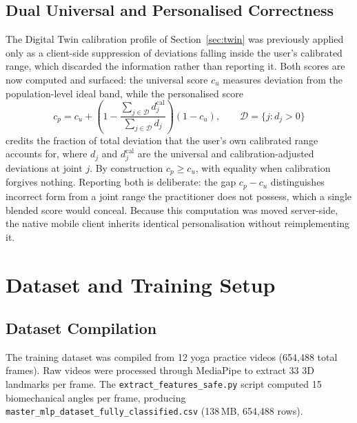 \documentclass[conference]{IEEEtran}
\begin{document}
\subsection{Dual Universal and Personalised Correctness}
\label{sec:dualscore}

The Digital Twin calibration profile of Section~\ref{sec:twin} was previously
applied only as a client-side suppression of deviations falling inside the
user's calibrated range, which discarded the information rather than
reporting it. Both scores are now computed and surfaced: the universal score
$c_u$ measures deviation from the population-level ideal band, while the
personalised score
\begin{equation}
c_p = c_u + \left(1 - \frac{\sum_{j \in \mathcal{D}} d_j^{\mathrm{cal}}}
{\sum_{j \in \mathcal{D}} d_j}\right)\left(1 - c_u\right),
\qquad
\mathcal{D} = \{j : d_j > 0\}
\label{eq:personal}
\end{equation}
credits the fraction of total deviation that the user's own calibrated range
accounts for, where $d_j$ and $d_j^{\mathrm{cal}}$ are the universal and
calibration-adjusted deviations at joint $j$. By construction $c_p \ge c_u$,
with equality when calibration forgives nothing. Reporting both is
deliberate: the gap $c_p - c_u$ distinguishes incorrect form from a joint
range the practitioner does not possess, which a single blended score would
conceal. Because this computation was moved server-side, the native mobile
client inherits identical personalisation without reimplementing it.

\section{Dataset and Training Setup}
\label{sec:data}

\subsection{Dataset Compilation}

The training dataset was compiled from 12 yoga practice videos (654,488 total frames).
Raw videos were processed through MediaPipe to extract 33 3D landmarks per frame. The
\texttt{extract\_features\_safe.py} script computed 15 biomechanical angles per frame,
producing \texttt{master\_mlp\_dataset\_fully\_classified.csv} (138\,MB, 654,488 rows).
\end{document}
